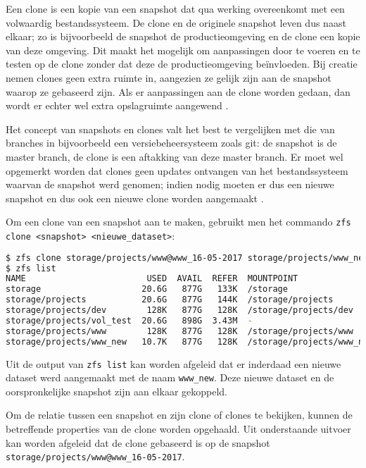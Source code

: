 Een clone is een kopie van een snapshot dat qua werking overeenkomt met een volwaardig bestandssysteem. De clone en de originele snapshot leven dus naast elkaar; zo is bijvoorbeeld de snapshot de productieomgeving en de clone een kopie van deze omgeving. Dit maakt het mogelijk om aanpassingen door te voeren en te testen op de clone zonder dat deze de productieomgeving beïnvloeden. Bij creatie nemen clones geen extra ruimte in, aangezien ze gelijk zijn aan de snapshot waarop ze gebaseerd zijn. Als er aanpassingen aan de clone worden gedaan, dan wordt er echter wel extra opslagruimte aangewend \autocite{Lucas2015}.

Het concept van snapshots en clones valt het best te vergelijken met die van branches in bijvoorbeeld een versiebeheersysteem zoals git: de snapshot is de master branch, de clone is een aftakking van deze master branch. Er moet wel opgemerkt worden dat clones geen updates ontvangen van het bestandssysteem waarvan de snapshot werd genomen; indien nodig moeten er dus een nieuwe snapshot en dus ook een nieuwe clone worden aangemaakt \autocite{Lucas2015}.

Om een clone van een snapshot aan te maken, gebruikt men het commando \texttt{zfs clone <snapshot> <nieuwe\_dataset>}:

\begin{lstlisting}[language=bash,style=command_style] 
$ zfs clone storage/projects/www@www_16-05-2017 storage/projects/www_new
$ zfs list
NAME                        USED  AVAIL  REFER  MOUNTPOINT
storage                    20.6G   877G   133K  /storage
storage/projects           20.6G   877G   144K  /storage/projects
storage/projects/dev        128K   877G   128K  /storage/projects/dev
storage/projects/vol_test  20.6G   898G  3.43M  -
storage/projects/www        128K   877G   128K  /storage/projects/www
storage/projects/www_new   10.7K   877G   128K  /storage/projects/www_new
\end{lstlisting}

Uit de output van \texttt{zfs list} kan worden afgeleid dat er inderdaad een nieuwe dataset werd aangemaakt met de naam \texttt{www\_new}. Deze nieuwe dataset en de oorspronkelijke snapshot zijn aan elkaar gekoppeld. 

Om de relatie tussen een snapshot en zijn clone of clones te bekijken, kunnen de betreffende properties van de clone worden opgehaald. Uit onderstaande uitvoer kan worden afgeleid dat de clone gebaseerd is op de snapshot \texttt{storage/projects/www@www\_16-05-2017}.

